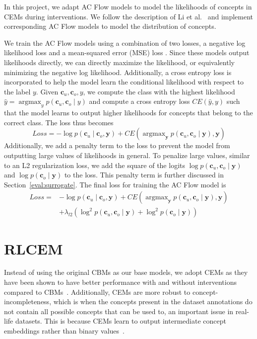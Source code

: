 In this project, we adapt AC Flow models to model the likelihoods of concepts in CEMs during interventions.
We follow the description of Li et al.~\cite{afa} and implement corresponding AC Flow models to model
the distribution of concepts.

We train the AC Flow models using a combination of two losses, a negative
log likelihood loss and a mean-squared error (MSE) loss . 
Since these models output likelihoods directly,
we can directly maximize the likelihood, or equivalently minimizing the negative log likelihood.
Additionally, a cross entropy loss is incorporated to help the model
learn the conditional likelihood with respect to the label $y$. 
Given $\mathbf{c}_u, \mathbf{c}_o, y$, we compute the class with the highest likelihood
$\hat{y} = \mathop{\mathrm{argmax}}_y p(\mathbf{c}_u, \mathbf{c}_o \mid y)$ and compute 
a cross entropy loss $CE(\hat{y}, y)$ such that the model learns to 
output higher likelihoods for concepts that belong to the correct class.
The loss thus becomes
\[Loss = - \log p(\mathbf{c}_u \mid \mathbf{c}_o, \mathbf{y}) +
 CE(\mathop{\mathrm{argmax}}_\mathbf{y} p(\mathbf{c}_u, \mathbf{c}_o \mid \mathbf{y}),  \mathbf{y})
\]
Additionally, we add a penalty term to the loss to prevent 
the model from outputting large values of likelihoods in general.
To penalize
large values, similar to an L2 regularization loss,
we add the square of the logits $\log p(\mathbf{c}_u, \mathbf{c}_o \mid \mathbf{y})$ and 
$\log p(\mathbf{c}_o \mid \mathbf{y})$
to the loss. 
This penalty term is further discussed in 
Section~\ref{eval:surrogate}. 
The final loss for training the
AC Flow model is
\begin{align*} 
Loss = & - \log p(\mathbf{c}_u \mid \mathbf{c}_o, \mathbf{y}) + 
CE(\mathop{\mathrm{argmax}}_\mathbf{y} p(\mathbf{c}_u, \mathbf{c}_o \mid \mathbf{y}),  \mathbf{y})
\\ & + \lambda_{l2} \left ( \log^2 p(\mathbf{c}_u, \mathbf{c}_o \mid \mathbf{y}) + 
\log^2 p(\mathbf{c}_o \mid \mathbf{y}) \right )
\end{align*}


\section{RLCEM}\label{method:rlcem}

Instead of using 
the original CBMs as our base models, we adopt CEMs as they have been shown to have
better performance with and without interventions compared to CBMs~\cite{cem}.
Additionally, CEMs are more robust to concept-incompleteness, 
which is when the concepts present 
in the dataset annotations do not contain all possible concepts
that can be used to, an important issue in real-life datasets. This is because
CEMs learn to output intermediate
concept embeddings rather than binary values~\cite{cem}.

